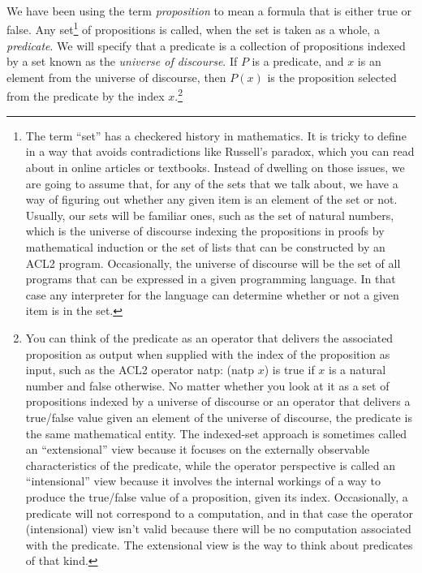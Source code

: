 {{\label{proposition-def}
We have been using the term \emph{proposition}
to mean a formula that is either true or false.
Any set\footnote{The
term
``set'' has a checkered history in mathematics.
It is tricky to define in a way that avoids contradictions
like Russell's paradox, which you can read about
in online articles or textbooks.
Instead of dwelling on those issues,
we are going to assume that,
for any of the sets that we talk about,
we have a way of figuring out whether any given
item is an element of the set or not.
Usually, our sets will be familiar ones,
such as the set of natural numbers, which
is the universe of discourse indexing the propositions
in proofs by mathematical induction or
the set of lists that can be constructed
by an ACL2 program.
Occasionally, the universe of discourse will be
the set of all programs that can be expressed in a given
programming language.
In that case
any interpreter for the language
can determine whether or
not a given item is in the set.}
of propositions is called,
when the set is taken as a whole, a
\label{predicate-def}\emph{predicate}.
We will specify that a predicate
is a collection of propositions
indexed by a set known as the
\label{def-universe-of-discourse}
\emph{universe of discourse}.
If $P$ is a predicate, and $x$ is an element from
the universe of discourse, then $P(x)$ is
the 
proposition
selected from the predicate by the index $x$.\footnote{You
can think of the predicate as an
operator that delivers the associated proposition as output
when supplied with the index of the proposition as input,
such as the ACL2 operator natp: (natp $x$) is true if
$x$ is a natural number and false otherwise.
No matter whether you look at it as a set of propositions
indexed by a universe of discourse or an operator that
delivers a true/false value given an element of the universe of discourse,
the predicate is the same mathematical entity.
The indexed-set approach is sometimes called an ``extensional'' view
because it focuses on the externally observable characteristics of the predicate,
while the operator perspective is called an ``intensional'' view
because it involves the internal workings of a way to produce the true/false value
of a proposition, given its index.
Occasionally, a predicate will not correspond to a computation,
and in that case the operator (intensional) view
isn't valid because there will be no
computation associated with the predicate.
The extensional view is the way
to think about predicates of that kind.}
}

}
